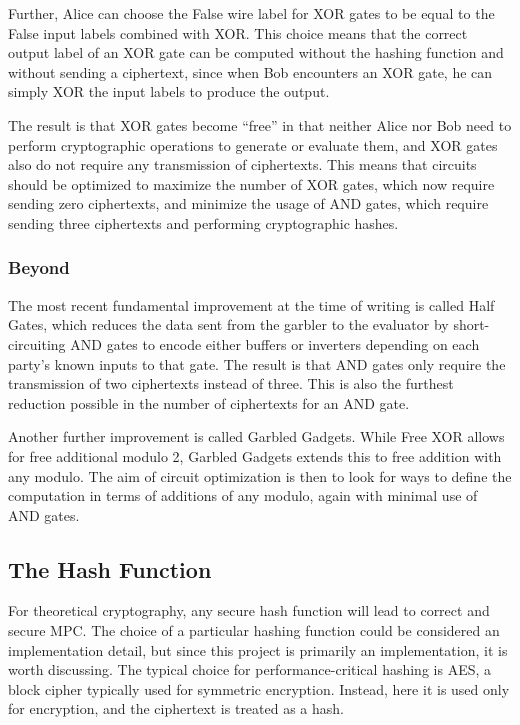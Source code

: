 Further, Alice can choose the False wire label for XOR gates to be equal to the False input labels combined with XOR. This choice means that the correct output label of an XOR gate can be computed without the hashing function and without sending a ciphertext, since when Bob encounters an XOR gate, he can simply XOR the input labels to produce the output\cite{gentle}.

The result is that XOR gates become ``free'' in that neither Alice nor Bob need to perform cryptographic operations to generate or evaluate them, and XOR gates also do not require any transmission of ciphertexts. This means that circuits should be optimized to maximize the number of XOR gates, which now require sending zero ciphertexts, and minimize the usage of AND gates, which require sending three ciphertexts and performing cryptographic hashes.

\subsubsection{Beyond}
The most recent fundamental improvement at the time of writing is called Half Gates\cite{HalfGates}, which reduces the data sent from the garbler to the evaluator by short-circuiting AND gates to encode either buffers or inverters depending on each party's known inputs to that gate. The result is that AND gates only require the transmission of two ciphertexts instead of three. This is also the furthest reduction possible in the number of ciphertexts for an AND gate\cite{HalfGates}.

Another further improvement is called Garbled Gadgets. While Free XOR allows for free additional modulo 2, Garbled Gadgets extends this to free addition with any modulo\cite{gentle}. The aim of circuit optimization is then to look for ways to define the computation in terms of additions of any modulo, again with minimal use of AND gates.

\subsection{The Hash Function}
For theoretical cryptography, any secure hash function will lead to correct and secure MPC. The choice of a particular hashing function could be considered an implementation detail, but since this project is primarily an implementation, it is worth discussing. The typical choice for performance-critical hashing is AES, a block cipher typically used for symmetric encryption. Instead, here it is used only for encryption, and the ciphertext is treated as a hash.

